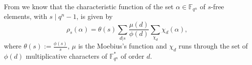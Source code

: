 \documentclass[12pt]{article}
\newtheorem{rem}[theorem]{Remark}
\newenvironment{remark}{\begin{rem}\em}{\end{rem}}
\newcommand{\F}{\mathbb{F}}
\def \Ord {\rm{Ord}\,}
\begin{document}
%
%


%
%


From \cite[Section 3]{CH} we know that the characteristic function of the 
set $\alpha \in \F_{q^n}$ of $s$-free elements, with $s \mid q^n - 1$, is given 
by
\begin{equation} \label{funcao caracteristica}
\rho_s(\alpha) = 
\theta(s)\sum_{d|s}\frac{\mu(d)}{\phi(d)}\sum_{\chi_d}\chi_d(\alpha),
\end{equation}
where $\theta(s):=\frac{\phi(s)}{s}$, $\mu$ is the Moebius's function and 
$\chi_d$ runs through the set of $\phi(d)$ multiplicative characters of 
$\mathbb{F}_{q^n}^*$ of order 
$d$.
\end{document}
